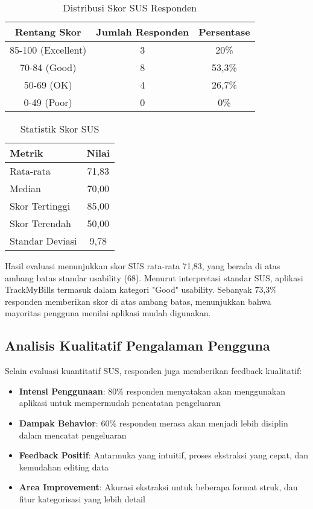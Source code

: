 \begin{table}[htbp]
\centering
\caption{Distribusi Skor SUS Responden}
\label{tab:sus-distribution}
\begin{tabular}{|c|c|c|}
\hline
\textbf{Rentang Skor} & \textbf{Jumlah Responden} & \textbf{Persentase} \\
\hline
85-100 (Excellent) & 3 & 20\% \\
\hline
70-84 (Good) & 8 & 53,3\% \\
\hline
50-69 (OK) & 4 & 26,7\% \\
\hline
0-49 (Poor) & 0 & 0\% \\
\hline
\end{tabular}
\end{table}

\begin{table}[htbp]
\centering
\caption{Statistik Skor SUS}
\label{tab:sus-statistics}
\begin{tabular}{|l|c|}
\hline
\textbf{Metrik} & \textbf{Nilai} \\
\hline
Rata-rata & 71,83 \\
\hline
Median & 70,00 \\
\hline
Skor Tertinggi & 85,00 \\
\hline
Skor Terendah & 50,00 \\
\hline
Standar Deviasi & 9,78 \\
\hline
\end{tabular}
\end{table}

Hasil evaluasi menunjukkan skor SUS rata-rata 71,83, yang berada di atas ambang batas standar usability (68). Menurut interpretasi standar SUS, aplikasi TrackMyBills termasuk dalam kategori "Good" usability. Sebanyak 73,3\% responden memberikan skor di atas ambang batas, menunjukkan bahwa mayoritas pengguna menilai aplikasi mudah digunakan.

\subsection{Analisis Kualitatif Pengalaman Pengguna}
Selain evaluasi kuantitatif SUS, responden juga memberikan feedback kualitatif:

\begin{itemize}
    \item \textbf{Intensi Penggunaan}: 80\% responden menyatakan akan menggunakan aplikasi untuk mempermudah pencatatan pengeluaran
    \item \textbf{Dampak Behavior}: 60\% responden merasa akan menjadi lebih disiplin dalam mencatat pengeluaran
    \item \textbf{Feedback Positif}: Antarmuka yang intuitif, proses ekstraksi yang cepat, dan kemudahan editing data
    \item \textbf{Area Improvement}: Akurasi ekstraksi untuk beberapa format struk, dan fitur kategorisasi yang lebih detail
\end{itemize}

